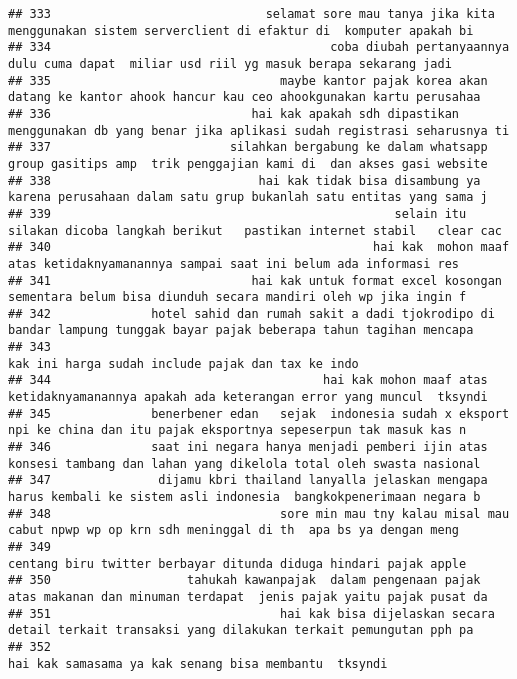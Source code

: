 \documentclass[
]{article}
\begin{document}
\begin{verbatim}
## 333                              selamat sore mau tanya jika kita menggunakan sistem serverclient di efaktur di  komputer apakah bi 
## 334                                       coba diubah pertanyaannya dulu cuma dapat  miliar usd riil yg masuk berapa sekarang jadi  
## 335                                maybe kantor pajak korea akan datang ke kantor ahook hancur kau ceo ahookgunakan kartu perusahaa 
## 336                            hai kak apakah sdh dipastikan menggunakan db yang benar jika aplikasi sudah registrasi seharusnya ti 
## 337                         silahkan bergabung ke dalam whatsapp group gasitips amp  trik penggajian kami di  dan akses gasi website
## 338                             hai kak tidak bisa disambung ya karena perusahaan dalam satu grup bukanlah satu entitas yang sama j 
## 339                                                selain itu silakan dicoba langkah berikut   pastikan internet stabil   clear cac 
## 340                                             hai kak  mohon maaf atas ketidaknyamanannya sampai saat ini belum ada informasi res 
## 341                            hai kak untuk format excel kosongan sementara belum bisa diunduh secara mandiri oleh wp jika ingin f 
## 342              hotel sahid dan rumah sakit a dadi tjokrodipo di bandar lampung tunggak bayar pajak beberapa tahun tagihan mencapa 
## 343                                                                                kak ini harga sudah include pajak dan tax ke indo
## 344                                      hai kak mohon maaf atas ketidaknyamanannya apakah ada keterangan error yang muncul  tksyndi
## 345              benerbener edan   sejak  indonesia sudah x eksport npi ke china dan itu pajak eksportnya sepeserpun tak masuk kas n
## 346              saat ini negara hanya menjadi pemberi ijin atas konsesi tambang dan lahan yang dikelola total oleh swasta nasional 
## 347               dijamu kbri thailand lanyalla jelaskan mengapa harus kembali ke sistem asli indonesia  bangkokpenerimaan negara b 
## 348                                sore min mau tny kalau misal mau cabut npwp wp op krn sdh meninggal di th  apa bs ya dengan meng 
## 349                                                                centang biru twitter berbayar ditunda diduga hindari pajak apple 
## 350                   tahukah kawanpajak  dalam pengenaan pajak atas makanan dan minuman terdapat  jenis pajak yaitu pajak pusat da 
## 351                                hai kak bisa dijelaskan secara detail terkait transaksi yang dilakukan terkait pemungutan pph pa 
## 352                                                                            hai kak samasama ya kak senang bisa membantu  tksyndi

\end{verbatim}
\end{document}
